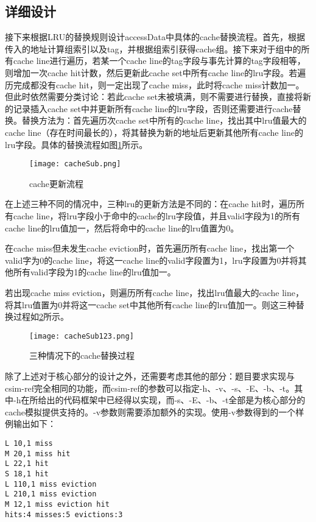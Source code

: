 \subsection{详细设计}
\label{sub:xiang_xi_she_ji_}
\par 接下来根据LRU的替换规则设计accessData中具体的cache替换流程。首先，根据传入的地址计算组索引以及tag，并根据组索引获得cache组。接下来对于组中的所有cache line进行遍历，若某一个cache line的tag字段与事先计算的tag字段相等，则增加一次cache hit计数，然后更新此cache set中所有cache line的lru字段。若遍历完成都没有cache hit，则一定出现了cache miss，此时将cache miss计数加一。但此时依然需要分类讨论：若此cache set未被填满，则不需要进行替换，直接将新的记录插入cache set中并更新所有cache line的lru字段，否则还需要进行cache替换。替换方法为：首先遍历次cache set中所有的cache line，找出其中lru值最大的cache line（存在时间最长的），将其替换为新的地址后更新其他所有cache line的lru字段。具体的替换流程如图\ref{fig:cacheSub}所示。

\begin{figure}[htb]
    \centering
    \texttt{[image: cacheSub.png]}
    \caption{cache更新流程}
    \label{fig:cacheSub}
\end{figure}

\par 在上述三种不同的情况中，三种lru的更新方法是不同的：在cache hit时，遍历所有cache line，将lru字段小于命中的cache的lru字段值，并且valid字段为1的所有cache line的lru值加一，然后将命中的cache line的lru值置为0。
\par 在cache miss但未发生cache eviction时，首先遍历所有cache line，找出第一个valid字为0的cache line，将这一cache line的valid字段置为1，lru字段置为0并将其他所有valid字段为1的cache line的lru值加一。
\par 若出现cache miss eviction，则遍历所有cache line，找出lru值最大的cache line，将其lru值置为0并将这一cache set中其他所有cache line的lru值加一。则这三种替换过程如\ref{fig:cacheSub123}所示。

\begin{figure}[htb]
    \centering
    \texttt{[image: cacheSub123.png]}
    \caption{三种情况下的cache替换过程}
    \label{fig:cacheSub123}
\end{figure}

\par 除了上述对于核心部分的设计之外，还需要考虑其他的部分：题目要求实现与csim-ref完全相同的功能，而csim-ref的参数可以指定-h、-v、-s、-E、-b、-t。其中-h在所给出的代码框架中已经得以实现，而-s、-E、-b、-t全部是为核心部分的cache模拟提供支持的。-v参数则需要添加额外的实现。使用-v参数得到的一个样例输出如下：
\begin{lstlisting}
L 10,1 miss
M 20,1 miss hit
L 22,1 hit
S 18,1 hit
L 110,1 miss eviction
L 210,1 miss eviction
M 12,1 miss eviction hit
hits:4 misses:5 evictions:3
\end{lstlisting}

